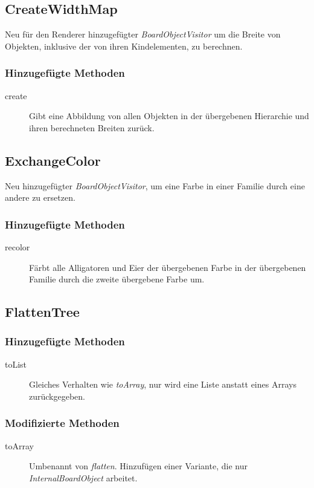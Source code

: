 \subsection{CreateWidthMap}
Neu für den Renderer hinzugefügter \emph{BoardObjectVisitor} um die Breite von Objekten, inklusive der von ihren Kindelementen, zu berechnen.

\subsubsection{Hinzugefügte Methoden}
\begin{description}
\item[create]
Gibt eine Abbildung von allen Objekten in der übergebenen Hierarchie und ihren berechneten Breiten zurück.
\end{description}


\subsection{ExchangeColor}
Neu hinzugefügter \emph{BoardObjectVisitor}, um eine Farbe in einer Familie durch eine andere zu ersetzen.

\subsubsection{Hinzugefügte Methoden}
\begin{description}
\item[recolor]
Färbt alle Alligatoren und Eier der übergebenen Farbe in der übergebenen Familie durch die zweite übergebene Farbe um.

\end{description}


\subsection{FlattenTree}

\subsubsection{Hinzugefügte Methoden}
\begin{description}
\item[toList]
Gleiches Verhalten wie \emph{toArray}, nur wird eine Liste anstatt eines Arrays zurückgegeben.
\end{description}

\subsubsection{Modifizierte Methoden}
\begin{description}
\item[toArray]
Umbenannt von \emph{flatten}. Hinzufügen einer Variante, die nur \emph{InternalBoardObject} arbeitet.
\end{description}


